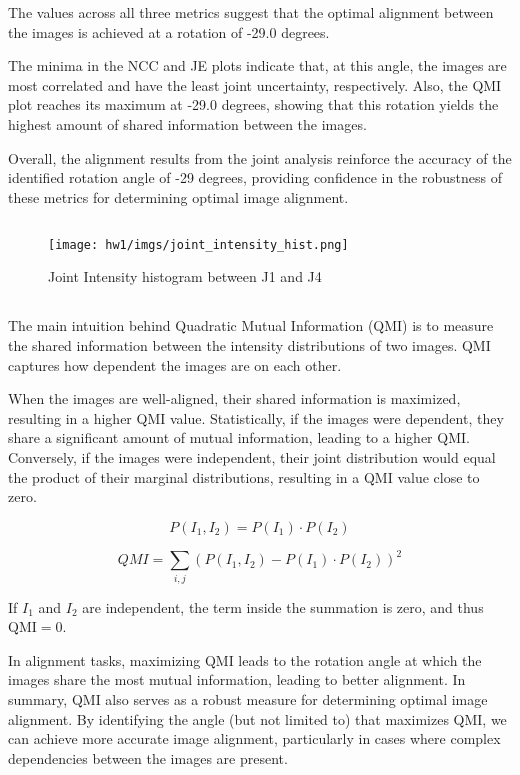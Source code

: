 \documentclass[a4paper, 11pt]{article}
\begin{document}
The values across all three metrics suggest that the optimal alignment between the images is achieved at a rotation of -29.0 degrees.

The minima in the NCC and JE plots indicate that, at this angle, the images are most correlated and have the least joint uncertainty, respectively. Also, the QMI plot reaches its maximum at -29.0 degrees, showing that this rotation yields the highest amount of shared information between the images.

Overall, the alignment results from the joint analysis reinforce the accuracy of the identified rotation angle of -29 degrees, providing confidence in the robustness of these metrics for determining optimal image alignment.

\newpage
\subsection{}
        \begin{figure}[h!] %
        \centering
        \texttt{[image: hw1/imgs/joint\_intensity\_hist.png]}
        \caption{Joint Intensity histogram between J1 and J4}
    \end{figure}
    

\subsection{} 
The main intuition behind Quadratic Mutual Information (QMI) is to measure the shared information between the intensity distributions of two images. QMI captures how dependent the images are on each other.

When the images are well-aligned, their shared information is maximized, resulting in a higher QMI value. Statistically, if the images were dependent, they share a significant amount of mutual information, leading to a higher QMI. Conversely, if the images were independent, their joint distribution would equal the product of their marginal distributions, resulting in a QMI value close to zero. 

\[
P(I_1, I_2) = P(I_1) \cdot P(I_2)
\]

\[
QMI = \sum_{i,j} \left( P(I_1, I_2) - P(I_1) \cdot P(I_2) \right)^2
\]

\hspace{1cm}If $I_1$ and $I_2$ are independent, the term inside the summation is zero, and thus $\text{QMI}=0$.


In alignment tasks, maximizing QMI leads to the rotation angle at which the images share the most mutual information, leading to better alignment. In summary, QMI also serves as a robust measure for determining optimal image alignment. By identifying the angle (but not limited to) that maximizes QMI, we can achieve more accurate image alignment, particularly in cases where complex dependencies between the images are present.
\end{document}
